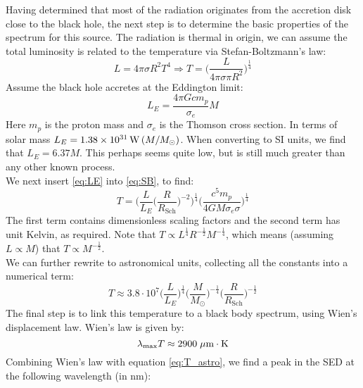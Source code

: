 \documentclass[11pt]{article}
\begin{document}
\clearpage
\noindent Having determined that most of the radiation originates from the accretion disk close to the black hole, the next step is to determine the basic properties of the spectrum for this source. The radiation is thermal in origin, we can assume the total luminosity is related to the temperature via Stefan-Boltzmann's law:
\begin{equation}
	L = 4\pi \sigma  R^2 T^4 \Rightarrow T = \Big(\frac{L}{4\pi\sigma \pi R^{2}}\Big)^{\frac{1}{4}}
	\label{eq:SB}
\end{equation}
Assume the black hole accretes at the Eddington limit:
\begin{equation}
	L_E = \frac{4\pi G c m_p}{\sigma_e} M
	\label{eq:LE}
\end{equation}
Here $m_p$ is the proton mass and $\sigma_e$ is the Thomson cross section. In terms of solar mass $L_E = 1.38\times10^{31} \, {\rm W} \, (M / M_{\odot})$. When converting to SI units, we find that $L_E = 6.37M$. This perhaps seems quite low, but is still much greater than any other known process.\\
We next insert \ref{eq:LE} into \ref{eq:SB}, to find:
\begin{equation}
	T = \Bigg(\frac{L}{L_E}\Big(\frac{R}{R_{\mathrm{Sch}}}\Big)^{-2}\Bigg)^{\frac{1}{4}}\Bigg(\frac{c^5 m_p}{4GM\sigma_e \sigma}\Bigg)^{\frac{1}{4}}
\end{equation}
The first term contains dimensionless scaling factors and the second term has unit Kelvin, as required. Note that $T\propto L^{\frac{1}{4}}R^{-\frac{1}{2}}M^{-\frac{1}{4}}$, which means (assuming $L\propto M$) that $T \propto M^{-\frac{1}{2}}$.\\
\indent We can further rewrite to astronomical units, collecting all the constants into a numerical term:
\begin{equation}
	T \approx 3.8\cdot 10^7 \Big(\frac{L}{L_E}\Big)^{\frac{1}{4}}\Big(\frac{M}{M_{\odot}}\Big)^{-\frac{1}{4}}\Big(\frac{R}{R_{\mathrm{Sch}}}\Big)^{-\frac{1}{2}}
	\label{eq:T_astro}
\end{equation}
The final step is to link this temperature to a black body spectrum, using Wien's displacement law. Wien's law is given by:
\begin{equation}
	\lambda_{\mathrm{max}}T \approx 2900 \hspace{1mm} \mu\mathrm{m}\cdot\mathrm{K}
	\label{eq:Wien}
\end{equation}
Combining Wien's law with equation \ref{eq:T_astro}, we find a peak in the SED at the following wavelength (in nm):
\end{document}

